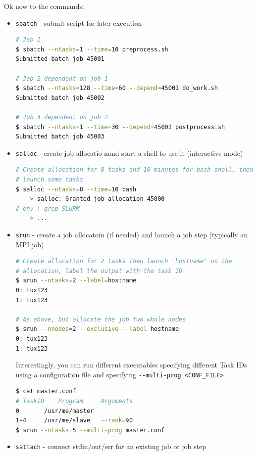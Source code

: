 \documentclass{article}
\begin{document}
\medskip Ok now to the commands:
\begin{itemize}
	\item \verb|sbatch| - submit script for later execution

\begin{lstlisting}[language=bash, frame=single]
# Job 1
$ sbatch --ntasks=1 --time=10 preprocess.sh
Submitted batch job 45001

# Job 2 dependent on job 1
$ sbatch --ntasks=128 --time=60 --depend=45001 do_work.sh
Submitted batch job 45002

# Job 3 dependent on job 2
$ sbatch --ntasks=1 --time=30 --depend=45002 postprocess.sh
Submitted batch job 45003
\end{lstlisting}

	\item \verb|salloc| - create job allocatio nand start a shell to use it
		(interactive mode)

\begin{lstlisting}[language=bash, frame=single]
# Create allocation for 8 tasks and 10 minutes for bash shell, then
# launch some tasks
$ salloc --ntasks=8 --time=10 bash
	> salloc: Granted job allocation 45000
# env | grep SLURM
	> ...
\end{lstlisting}

	\item \verb|srun| - create a job allocatoin (if needed) and launch a job
		step (typically an MPI job)

\begin{lstlisting}[language=bash, frame=single]
# Create allocation for 2 tasks then launch "hostname" on the 
# allocation, label the output with the task ID
$ srun --ntasks=2 --label=hostname
0: tux123
1: tux123 

# As above, but allocate the job two whole nodes
$ srun --nnodes=2 --exclusive --label hostname
0: tux123
1: tux123 
\end{lstlisting}

		Interestingly, you can run different executables specifying different
		Task IDs using a configuration file and specifying
		\verb|--multi-prog <CONF_FILE>| 

\begin{lstlisting}[language=bash, frame=single]
$ cat master.conf
# TaskID	Program		Arguments
0		/usr/me/master	
1-4		/usr/me/slave	--rank=%0
$ srun --ntasks=5 --multi-prog master.conf
\end{lstlisting}

	\item \verb|sattach| - connect stdin/out/err for an existing job or job step
\end{itemize}
\end{document}
